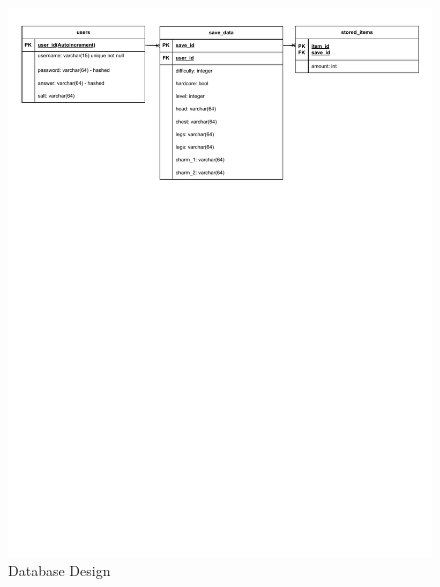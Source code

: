 \documentclass{article}
\begin{document}
        \begin{figure}[H]
                \centering
                \includegraphics[width=\textwidth, trim = 0 525 0 25, clip]{images/design/Database_Design_Second.pdf}
                \caption{Database Design}
        \end{figure}
\end{document}
